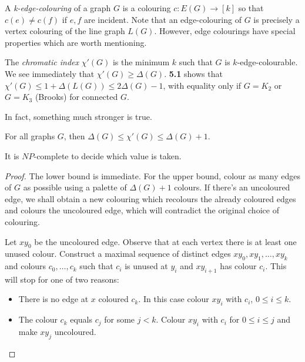 \documentclass[10pt,a4paper]{article}
\begin{document}
A \emph{k-edge-colouring} of a graph $G$ is a colouring $c:E(G)\to [k]$ so that $c(e)\neq c(f)$ if $e,f$ are incident. Note that an edge-colouring of $G$ is precisely a vertex colouring of the line graph $L(G)$. However, edge colourings have special properties which are worth mentioning.

The \emph{chromatic index} $\chi'(G)$ is the minimum $k$ such that $G$ is $k$-edge-colourable. We see immediately that $\chi'(G) \geq \Delta(G)$. \textbf{5.1} shows that $\chi'(G) \leq 1+\Delta(L(G)) \leq 2\Delta(G)-1$, with equality only if $G = K_2$ or $G=K_3$ (Brooks) for connected $G$.

In fact, something much stronger is true.
\begin{theorem}[Vizing]
For all graphs $G$, then $\Delta(G) \leq \chi'(G) \leq \Delta(G)+1$.
\end{theorem}
It is $NP$-complete to decide which value is taken.
\begin{proof}
The lower bound is immediate. For the upper bound, colour as many edges of $G$ as possible using a palette of $\Delta(G)+1$ colours. If there's an uncoloured edge, we shall obtain a new colouring which recolours the already coloured edges and colours the uncoloured edge, which will contradict the original choice of colouring.

Let $xy_0$ be the uncoloured edge. Observe that at each vertex there is at least one unused colour. Construct a maximal sequence of distinct edges $xy_0, xy_1, \ldots, xy_k$ and colours $c_0,\ldots,c_k$ such that $c_i$ is unused at $y_i$ and $xy_{i+1}$ has colour $c_i$. This will stop for one of two reasons:
\begin{itemize}
\item There is no edge at $x$ coloured $c_k$. In this case colour $xy_i$ with $c_i$, $0\leq i\leq k$.
\item The colour $c_k$ equals $c_j$ for some $j < k$. Colour $xy_i$ with $c_i$ for $0\leq i\leq j$ and make $xy_j$ uncoloured.
\end{itemize}
\end{proof}
\end{document}
